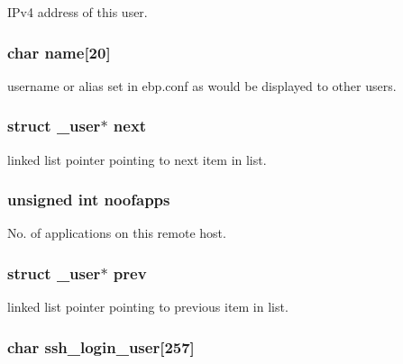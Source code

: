 \-I\-Pv4 address of this user. 

\hypertarget{struct__user_a9997d8ee2df51d18efed254a5aa016fd}{
\subsubsection[{name}]{\setlength{\rightskip}{0pt plus 5cm}char {\bf name}\mbox{[}20\mbox{]}}}\label{struct__user_a9997d8ee2df51d18efed254a5aa016fd}


username or alias set in ebp.\-conf as would be displayed to other users. 

\hypertarget{struct__user_a8519a91a83c9b946512eaafe3b7a6c4b}{
\subsubsection[{next}]{\setlength{\rightskip}{0pt plus 5cm}struct {\bf \-\_\-user}$\ast$ {\bf next}}}\label{struct__user_a8519a91a83c9b946512eaafe3b7a6c4b}


linked list pointer pointing to next item in list. 

\hypertarget{struct__user_af1ec161713df6e2c66484fc4bdedd69e}{
\subsubsection[{noofapps}]{\setlength{\rightskip}{0pt plus 5cm}unsigned int {\bf noofapps}}}\label{struct__user_af1ec161713df6e2c66484fc4bdedd69e}


\-No. of applications on this remote host. 

\hypertarget{struct__user_a77ae9f3a44069973bbb7bffeff831ba9}{
\subsubsection[{prev}]{\setlength{\rightskip}{0pt plus 5cm}struct {\bf \-\_\-user}$\ast$ {\bf prev}}}\label{struct__user_a77ae9f3a44069973bbb7bffeff831ba9}


linked list pointer pointing to previous item in list. 

\hypertarget{struct__user_af76bd0a7de47a2e1828baff39eaaed91}{
\subsubsection[{ssh\-\_\-login\-\_\-user}]{\setlength{\rightskip}{0pt plus 5cm}char {\bf ssh\-\_\-login\-\_\-user}\mbox{[}257\mbox{]}}}\label{struct__user_af76bd0a7de47a2e1828baff39eaaed91}


